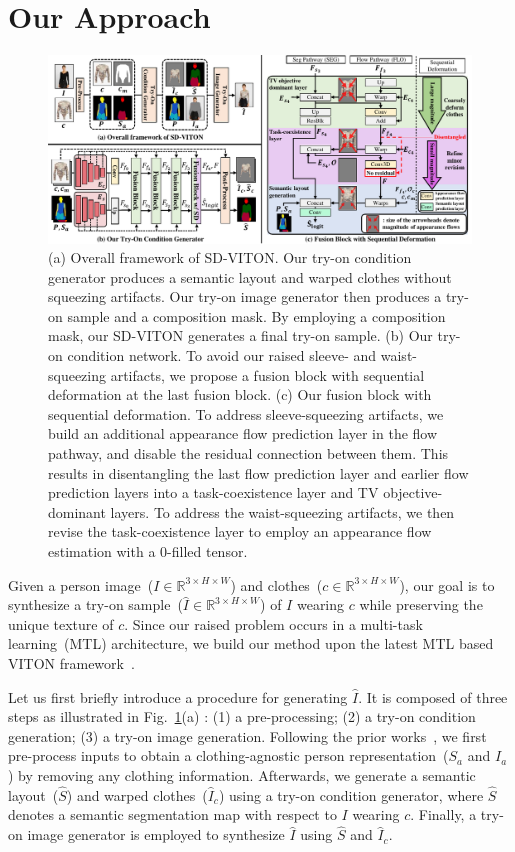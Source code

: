 \documentclass[letterpaper]{article} %
\begin{document}
\section{Our Approach}
\label{sec_method}

\begin{figure}[t!]
    \centering
     \includegraphics[width=\linewidth]{fig/fig2.pdf}
     \caption{(a) Overall framework of SD-VITON. Our try-on condition generator produces a semantic layout and warped clothes without squeezing artifacts. Our try-on image generator then produces a try-on sample and a composition mask. By employing a composition mask, our SD-VITON generates a final try-on sample. (b) Our try-on condition network. To avoid our raised sleeve- and waist-squeezing artifacts, we propose a fusion block with sequential deformation at the last fusion block. (c) Our fusion block with sequential deformation. To address sleeve-squeezing artifacts, we build an additional appearance flow prediction layer in the flow pathway, and disable the residual connection between them. This results in disentangling the last flow prediction layer and earlier flow prediction layers into a task-coexistence layer and TV objective-dominant layers.
     To address the waist-squeezing artifacts, we then revise the task-coexistence layer to employ an appearance flow estimation with a 0-filled tensor.
     }
     \label{main_figure}
\end{figure}

Given a person image~($I \in \mathbb{R}^{3\times H\times W}$) and clothes~($c \in \mathbb{R}^{3\times H\times W}$), our goal is to synthesize a try-on sample~($\hat{I} \in \mathbb{R}^{3\times H\times W}$) of $I$ wearing $c$ while preserving the unique texture of $c$.
Since our raised problem occurs in a multi-task learning~(MTL) architecture, we build our method upon the latest MTL based VITON framework~\cite{lee2022hrviton}.

Let us first briefly introduce a procedure for generating $\hat{I}$.
It is composed of three steps as illustrated in Fig.~\ref{main_figure}(a) : (1) a pre-processing; (2) a try-on condition generation; (3) a try-on image generation.
Following the prior works~\cite{choi2021viton, lee2022hrviton}, we first pre-process inputs to obtain a clothing-agnostic person representation~($S_a$ and $I_a$) by removing any clothing information.
Afterwards, we generate a semantic layout~($\hat{S}$) and warped clothes~($\hat{I}_c$) using a try-on condition generator, where $\hat{S}$ denotes a semantic segmentation map with respect to $I$ wearing $c$.
Finally, a try-on image generator is employed to synthesize $\hat{I}$ using $\hat{S}$ and $\hat{I}_c$.
\end{document}
